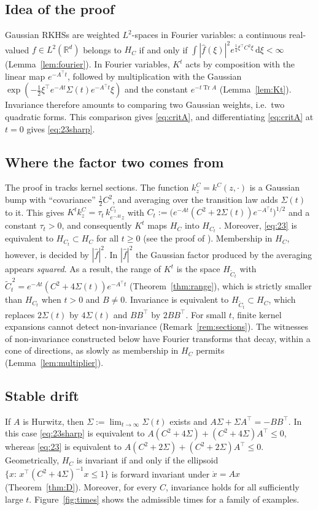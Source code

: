 \documentclass[11pt]{amsart}
\numberwithin{equation}{section}
\theoremstyle{definition}
\theoremstyle{remark}
\newcommand{\R}{\mathbb{R}}
\newcommand{\Tr}{\operatorname{Tr}}
\newcommand{\dd}{\,\mathrm{d}}
\newcommand{\Ct}{\widetilde{C}_t}
\newcommand{\hatf}[1]{\widehat{#1}}
\newcommand{\tp}{\top}
\begin{document}
\subsection*{Idea of the proof}
Gaussian RKHSs are weighted $L^2$-spaces in Fourier variables: a continuous real-valued $f\in L^2(\R^d)$ belongs
to $H_C$ if and only if $\int|\hatf f(\xi)|^2e^{\frac14\xi^\tp C^2\xi}\dd\xi<\infty$ (Lemma~\ref{lem:fourier}). In Fourier variables, $K^t$
acts by composition with the linear map $e^{-A^\tp t}$, followed by multiplication with the Gaussian
$\exp(-\frac12\xi^\tp e^{-At}\Sigma(t)e^{-A^\tp t}\xi)$ and the constant $e^{-t\Tr A}$ (Lemma~\ref{lem:Kt}). Invariance therefore amounts to comparing two Gaussian weights, i.e.\ two quadratic forms.
This comparison gives \eqref{eq:critA}, and differentiating \eqref{eq:critA} at $t=0$ gives \eqref{eq:23sharp}.

\subsection*{Where the factor two comes from}
The proof in \cite{PSWPN} tracks kernel sections. The function $k^C_z=k^C(z,\cdot)$ is a Gaussian bump with
``covariance'' $\frac12C^2$, and averaging over the transition law adds $\Sigma(t)$ to it. This gives
$K^tk^C_z=\tau_t\,k^{C_t}_{e^{-At}z}$ with $C_t:=\bigl(e^{-At}(C^2+2\Sigma(t))e^{-A^\tp t}\bigr)^{1/2}$ and a constant
$\tau_t>0$, and consequently $K^t$ maps $H_C$ into $H_{C_t}$ \cite[Proposition~4.1 and its proof]{PSWPN}. Moreover,
\eqref{eq:23} is equivalent to $H_{C_t}\subset H_C$ for all $t\ge0$ (see the proof of \cite[Theorem~2.1]{PSWPN}). Membership in $H_C$, however, is decided by $|\hatf f|^2$. In
$|\hatf f|^2$ the Gaussian factor produced by the averaging appears \emph{squared}. As a result, the range of $K^t$
is the space $H_{\Ct}$ with $\Ct^{\,2}=e^{-At}(C^2+4\Sigma(t))e^{-A^\tp t}$ (Theorem~\ref{thm:range}), which is strictly
smaller than $H_{C_t}$ when $t>0$ and $B\ne0$. Invariance is equivalent to $H_{\Ct}\subset H_C$, which replaces $2\Sigma(t)$ by
$4\Sigma(t)$ and $BB^\tp$ by $2BB^\tp$. For small $t$, finite kernel expansions cannot detect non-invariance
(Remark~\ref{rem:sections}). The witnesses of non-invariance constructed below have Fourier transforms that decay,
within a cone of directions, as slowly as membership in $H_C$ permits (Lemma~\ref{lem:multiplier}).

\subsection*{Stable drift}
If $A$ is Hurwitz, then $\Sigma:=\lim_{t\to\infty}\Sigma(t)$ exists and $A\Sigma+\Sigma A^\tp=-BB^\tp$. In this case
\eqref{eq:23sharp} is equivalent to $A(C^2+4\Sigma)+(C^2+4\Sigma)A^\tp\le0$, whereas \eqref{eq:23} is equivalent
to $A(C^2+2\Sigma)+(C^2+2\Sigma)A^\tp\le0$. Geometrically, $H_C$ is invariant if and only if the ellipsoid
$\{x:\,x^\tp(C^2+4\Sigma)^{-1}x\le1\}$ is forward invariant under $\dot x=Ax$ (Theorem~\ref{thm:D}). Moreover, for
every $C$, invariance holds for all sufficiently large $t$. Figure~\ref{fig:times} shows the admissible times for
a family of examples.
\end{document}

